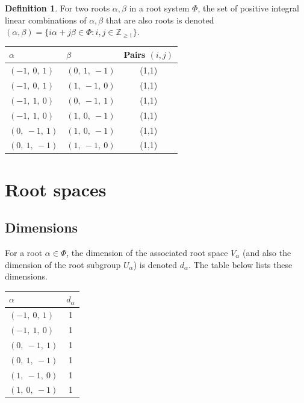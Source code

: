 \documentclass[11pt]{article}
\newcommand{\noi}{\noindent}
\theoremstyle{definition}
\newtheorem{definition}{Definition}[section]
\begin{document}
\begin{definition}
For two roots $\alpha, \beta$ in a root system $\Phi$, the set of positive integral linear combinations of $\alpha, \beta$ that are also roots is denoted
\(
	(\alpha, \beta) = \{ i \alpha + j \beta \in \Phi : i, j \in \mathbb{Z}_{\ge 1} \}
\).
\end{definition}
\noi \noindent \begin{longtable}{|l|l|c|}
    \hline
    $\alpha$ & $\beta$ & Pairs $(i,j)$ \\
    \hline
    \endhead
    $\left( -1, \  0, \  1\right)$ & $\left( 0, \  1, \  -1\right)$ & (1,1) \\
    \hline
    $\left( -1, \  0, \  1\right)$ & $\left( 1, \  -1, \  0\right)$ & (1,1) \\
    \hline
    $\left( -1, \  1, \  0\right)$ & $\left( 0, \  -1, \  1\right)$ & (1,1) \\
    \hline
    $\left( -1, \  1, \  0\right)$ & $\left( 1, \  0, \  -1\right)$ & (1,1) \\
    \hline
    $\left( 0, \  -1, \  1\right)$ & $\left( 1, \  0, \  -1\right)$ & (1,1) \\
    \hline
    $\left( 0, \  1, \  -1\right)$ & $\left( 1, \  -1, \  0\right)$ & (1,1) \\
    \hline
\end{longtable}

\fi

\newpage
\section{Root spaces}

\subsection{Dimensions}

For a root $\alpha \in \Phi$, the dimension of the associated root space $V_\alpha$ (and also the dimension of the root subgroup $U_\alpha$) is denoted $d_\alpha$. The table below lists these dimensions.

\bigskip

\noindent \begin{tabular}{|l|c|}
    \hline
    \textbf{$\alpha$} & \textbf{$d_{\alpha}$} \\
    \hline
    $\left( -1, \  0, \  1\right)$ & 1 \\
    \hline
    $\left( -1, \  1, \  0\right)$ & 1 \\
    \hline
    $\left( 0, \  -1, \  1\right)$ & 1 \\
    \hline
    $\left( 0, \  1, \  -1\right)$ & 1 \\
    \hline
    $\left( 1, \  -1, \  0\right)$ & 1 \\
    \hline
    $\left( 1, \  0, \  -1\right)$ & 1 \\
    \hline
\end{tabular}
\end{document}
